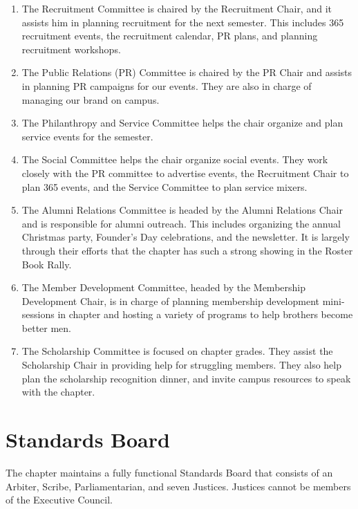 	\begin{enumerate}
	  \item The Recruitment Committee is chaired by the Recruitment Chair, and it assists him in planning recruitment for the next semester. This includes 365 recruitment events, the recruitment calendar, PR plans, and planning recruitment workshops.
		
	  \item The Public Relations (PR) Committee is chaired by the PR Chair and assists in planning PR campaigns for our events. They are also in charge of managing our brand on campus. 
		
	  \item The Philanthropy and Service Committee helps the chair organize and plan service events for the semester.
		
	  \item The Social Committee helps the chair organize social events. They work closely with the PR committee to advertise events, the Recruitment Chair to plan 365 events, and the Service Committee to plan service mixers. 
		
	  \item The Alumni Relations Committee is headed by the Alumni Relations Chair and is responsible for alumni outreach. This includes organizing the annual Christmas party, Founder’s Day celebrations, and the newsletter. It is largely through their efforts that the chapter has such a strong showing in the Roster Book Rally.
		
	  \item The Member Development Committee, headed by the Membership Development Chair, is in charge of planning membership development mini-sessions in chapter and hosting a variety of programs to help brothers become better men.
		
	  \item The Scholarship Committee is focused on chapter grades. They assist the Scholarship Chair in providing help for struggling members. They also help plan the scholarship recognition dinner, and invite campus resources to speak with the chapter.
	\end{enumerate}
    
    \section*{Standards Board}
      The chapter maintains a fully functional Standards Board that consists of an Arbiter, Scribe, Parliamentarian, and seven Justices. Justices cannot be members of the Executive Council. \\

